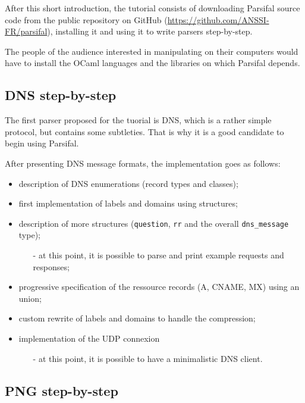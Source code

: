 \documentclass{article}
\begin{document}
After this short introduction, the tutorial consists of downloading
Parsifal source code from the public repository on GitHub
(\url{https://github.com/ANSSI-FR/parsifal}), installing it and using
it to write parsers step-by-step.

The people of the audience interested in manipulating on their
computers would have to install the OCaml languages and the libraries
on which Parsifal depends.


\subsection{DNS step-by-step}

The first parser proposed for the tuorial is DNS, which is a rather
simple protocol, but contains some subtleties. That is why it is a
good candidate to begin using Parsifal.

After presenting DNS message formats, the implementation goes as
follows:
\begin{itemize}
\item description of DNS enumerations (record types and classes);
\item first implementation of labels and domains using structures;
\item description of more structures (\texttt{question}, \texttt{rr}
  and the overall \texttt{dns\_message} type);
\begin{itemize}
\item[-] at this point, it is possible to parse and print example
  requests and responses;
\end{itemize}
\item progressive specification of the ressource records (A, CNAME,
  MX) using an union;
\item custom rewrite of labels and domains to handle the compression;
\item implementation of the UDP connexion
\begin{itemize}
\item[-] at this point, it is possible to have a minimalistic DNS client.
\end{itemize}
\end{itemize}


\subsection{PNG step-by-step}
\end{document}
